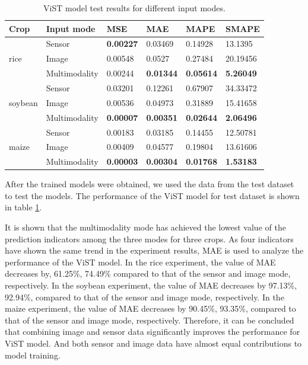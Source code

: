 \documentclass[acmsmall, screen]{acmart}
\begin{document}
\begin{table}[htbp]
  \centering
  \caption{ViST model test results for different input modes.}
    \begin{tabular}{llllll}
    \toprule
    Crop  & \multicolumn{1}{l}{Input mode} & MSE   & \multicolumn{1}{l}{MAE} & MAPE  & SMAPE \\
    \midrule
    \multirow{3}[1]{*}{rice} & Sensor & \textbf{0.00227} & 0.03469 & 0.14928 & 13.1395 \\
          & Image & 0.00548 & 0.0527 & 0.27484 & 20.19456 \\
          & Multimodality & 0.00244 & \textbf{0.01344} & \textbf{0.05614} & \textbf{5.26049} \\
          \midrule
    \multirow{3}[0]{*}{soybean} & Sensor & 0.03201 & 0.12261 & 0.67907 & 34.33472 \\
          & Image & 0.00536 & 0.04973 & 0.31889 & 15.41658 \\
          & Multimodality & \textbf{0.00007} & \textbf{0.00351} & \textbf{0.02644} & \textbf{2.06496} \\
          \midrule
    \multirow{3}[1]{*}{maize} & Sensor & 0.00183 & 0.03185 & 0.14455 & 12.50781 \\
          & Image & 0.00409 & 0.04577 & 0.19804 & 13.61606 \\
          & Multimodality & \textbf{0.00003} & \textbf{0.00304} & \textbf{0.01768} & \textbf{1.53183} \\
    \bottomrule
    \end{tabular}%
  \label{tab:vist_model_test_results}%
\end{table}%


After the trained models were obtained, we used the data from the test dataset to test the models. The performance of the ViST model for test dataset is shown in table \ref{tab:vist_model_test_results}.

It is shown that the multimodality mode has achieved the lowest value of the prediction indicators among the three modes for three crops. As four indicators have shown the same trend in the experiment results, MAE is used to analyze the performance of the ViST model. In the rice experiment, the value of MAE decreases by, 61.25\%, 74.49\% compared to that of the sensor and image mode, respectively. In the soybean experiment, the value of MAE decreases by 97.13\%, 92.94\%, compared to that of the sensor and image mode, respectively. In the maize experiment, the value of MAE decreases by 90.45\%, 93.35\%, compared to that of the sensor and image mode, respectively. Therefore, it can be concluded that combining image and sensor data significantly improves the performance for ViST model. And both sensor and image data have almost equal contributions to model training.
\end{document}
